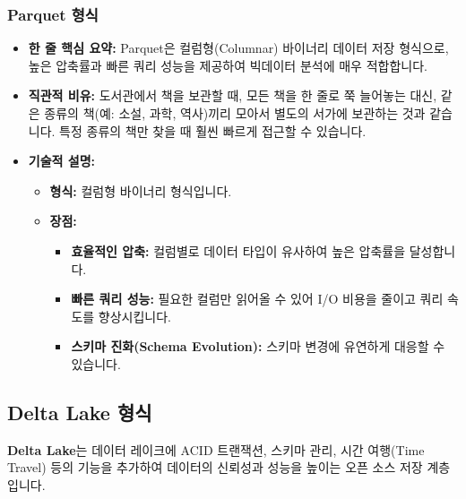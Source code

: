\documentclass[11pt,a4paper]{article}
\theoremstyle{definition}
\begin{document}
\subsubsection{Parquet 형식}
\begin{itemize}
    \item \textbf{한 줄 핵심 요약:} Parquet은 컬럼형(Columnar) 바이너리 데이터 저장 형식으로, 높은 압축률과 빠른 쿼리 성능을 제공하여 빅데이터 분석에 매우 적합합니다.
    \item \textbf{직관적 비유:} 도서관에서 책을 보관할 때, 모든 책을 한 줄로 쭉 늘어놓는 대신, 같은 종류의 책(예: 소설, 과학, 역사)끼리 모아서 별도의 서가에 보관하는 것과 같습니다. 특정 종류의 책만 찾을 때 훨씬 빠르게 접근할 수 있습니다.
    \item \textbf{기술적 설명:}
    \begin{itemize}
        \item \textbf{형식:} 컬럼형 바이너리 형식입니다.
        \item \textbf{장점:}
        \begin{itemize}
            \item \textbf{효율적인 압축:} 컬럼별로 데이터 타입이 유사하여 높은 압축률을 달성합니다.
            \item \textbf{빠른 쿼리 성능:} 필요한 컬럼만 읽어올 수 있어 I/O 비용을 줄이고 쿼리 속도를 향상시킵니다.
            \item \textbf{스키마 진화(Schema Evolution):} 스키마 변경에 유연하게 대응할 수 있습니다.
        \end{itemize}
    \end{itemize}
\end{itemize}

\subsection{Delta Lake 형식}

\begin{conceptbox}
\textbf{Delta Lake}는 데이터 레이크에 ACID 트랜잭션, 스키마 관리, 시간 여행(Time Travel) 등의 기능을 추가하여 데이터의 신뢰성과 성능을 높이는 오픈 소스 저장 계층입니다.
\end{conceptbox}
\end{document}
